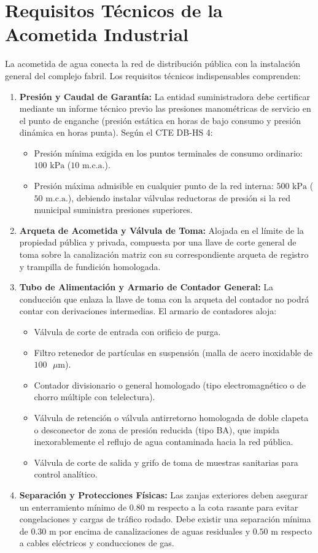 \documentclass{report}
\begin{document}
\section{Requisitos Técnicos de la Acometida Industrial}
La acometida de agua conecta la red de distribución pública con la instalación general del complejo fabril. Los requisitos técnicos indispensables comprenden:

\begin{enumerate}
    \item \textbf{Presión y Caudal de Garantía:} La entidad suministradora debe certificar mediante un informe técnico previo las presiones manométricas de servicio en el punto de enganche (presión estática en horas de bajo consumo y presión dinámica en horas punta). Según el CTE DB-HS 4:
    \begin{itemize}
        \item Presión mínima exigida en los puntos terminales de consumo ordinario: $100\text{ kPa}$ ($10\text{ m.c.a.}$).
        \item Presión máxima admisible en cualquier punto de la red interna: $500\text{ kPa}$ ($50\text{ m.c.a.}$), debiendo instalar válvulas reductoras de presión si la red municipal suministra presiones superiores.
    \end{itemize}
    \item \textbf{Arqueta de Acometida y Válvula de Toma:} Alojada en el límite de la propiedad pública y privada, compuesta por una llave de corte general de toma sobre la canalización matriz con su correspondiente arqueta de registro y trampilla de fundición homologada.
    \item \textbf{Tubo de Alimentación y Armario de Contador General:} La conducción que enlaza la llave de toma con la arqueta del contador no podrá contar con derivaciones intermedias. El armario de contadores aloja:
    \begin{itemize}
        \item Válvula de corte de entrada con orificio de purga.
        \item Filtro retenedor de partículas en suspensión (malla de acero inoxidable de $100\text{ }\mu\text{m}$).
        \item Contador divisionario o general homologado (tipo electromagnético o de chorro múltiple con telelectura).
        \item Válvula de retención o válvula antirretorno homologada de doble clapeta o desconector de zona de presión reducida (tipo BA), que impida inexorablemente el reflujo de agua contaminada hacia la red pública.
        \item Válvula de corte de salida y grifo de toma de muestras sanitarias para control analítico.
    \end{itemize}
    \item \textbf{Separación y Protecciones Físicas:} Las zanjas exteriores deben asegurar un enterramiento mínimo de $0.80\text{ m}$ respecto a la cota rasante para evitar congelaciones y cargas de tráfico rodado. Debe existir una separación mínima de $0.30\text{ m}$ por encima de canalizaciones de aguas residuales y $0.50\text{ m}$ respecto a cables eléctricos y conducciones de gas.
\end{enumerate}
\end{document}
